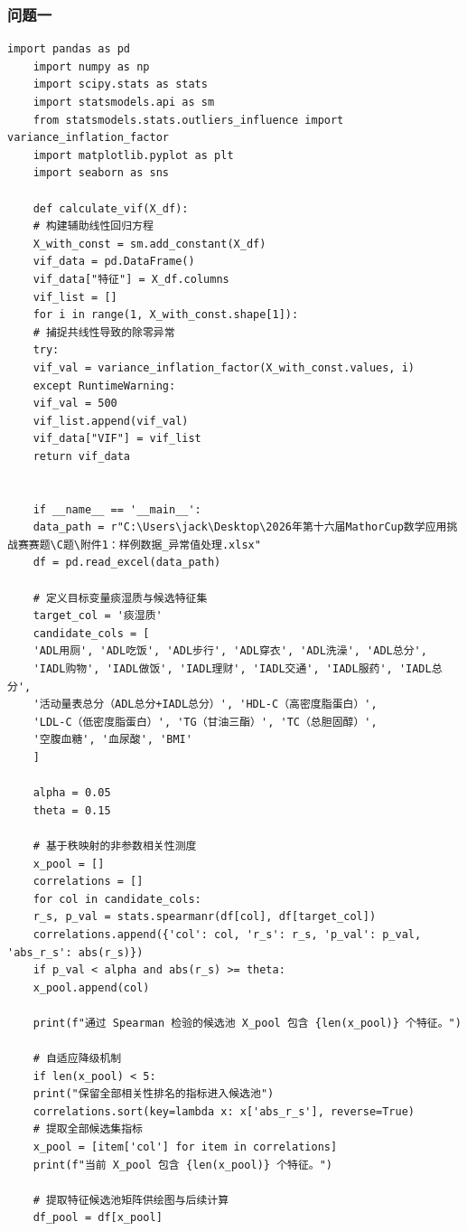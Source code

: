 \documentclass[12pt]{article}
\begin{document}
\subsubsection{问题一} 
\begin{lstlisting}[caption={Spearman相关性检验+VIF多重共线性诊断特征筛选}, label={code:feature_selection_vif}]
	import pandas as pd
	import numpy as np
	import scipy.stats as stats
	import statsmodels.api as sm
	from statsmodels.stats.outliers_influence import variance_inflation_factor
	import matplotlib.pyplot as plt
	import seaborn as sns
	
	def calculate_vif(X_df):
	# 构建辅助线性回归方程
	X_with_const = sm.add_constant(X_df)
	vif_data = pd.DataFrame()
	vif_data["特征"] = X_df.columns
	vif_list = []
	for i in range(1, X_with_const.shape[1]):
	# 捕捉共线性导致的除零异常
	try:
	vif_val = variance_inflation_factor(X_with_const.values, i)
	except RuntimeWarning:
	vif_val = 500
	vif_list.append(vif_val)
	vif_data["VIF"] = vif_list
	return vif_data
	
	
	if __name__ == '__main__':
	data_path = r"C:\Users\jack\Desktop\2026年第十六届MathorCup数学应用挑战赛赛题\C题\附件1：样例数据_异常值处理.xlsx"
	df = pd.read_excel(data_path)
	
	# 定义目标变量痰湿质与候选特征集
	target_col = '痰湿质'
	candidate_cols = [
	'ADL用厕', 'ADL吃饭', 'ADL步行', 'ADL穿衣', 'ADL洗澡', 'ADL总分',
	'IADL购物', 'IADL做饭', 'IADL理财', 'IADL交通', 'IADL服药', 'IADL总分',
	'活动量表总分（ADL总分+IADL总分）', 'HDL-C（高密度脂蛋白）',
	'LDL-C（低密度脂蛋白）', 'TG（甘油三酯）', 'TC（总胆固醇）',
	'空腹血糖', '血尿酸', 'BMI'
	]
	
	alpha = 0.05
	theta = 0.15
	
	# 基于秩映射的非参数相关性测度
	x_pool = []
	correlations = []
	for col in candidate_cols:
	r_s, p_val = stats.spearmanr(df[col], df[target_col])
	correlations.append({'col': col, 'r_s': r_s, 'p_val': p_val, 'abs_r_s': abs(r_s)})
	if p_val < alpha and abs(r_s) >= theta:
	x_pool.append(col)
	
	print(f"通过 Spearman 检验的候选池 X_pool 包含 {len(x_pool)} 个特征。")
	
	# 自适应降级机制
	if len(x_pool) < 5:
	print("保留全部相关性排名的指标进入候选池")
	correlations.sort(key=lambda x: x['abs_r_s'], reverse=True)
	# 提取全部候选集指标
	x_pool = [item['col'] for item in correlations]
	print(f"当前 X_pool 包含 {len(x_pool)} 个特征。")
	
	# 提取特征候选池矩阵供绘图与后续计算
	df_pool = df[x_pool]
	

\end{lstlisting}
\end{document}
